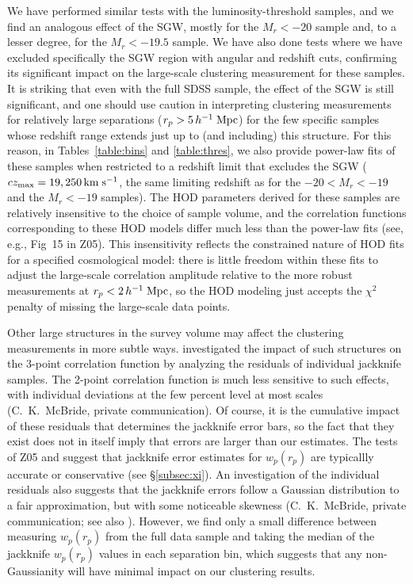 \documentclass[]{emulateapj}
\newcommand{\kms}{\,{\rm km}\;{\rm s}^{-1}}
\newcommand{\hmpc}{\,h^{-1}\;{\rm Mpc}}
\newcommand{\wrp}{{w_p(r_p)}}
\begin{document}
We have performed similar tests with the luminosity-threshold samples, and
we find an analogous effect of the SGW, mostly for the $M_r<-20$ sample and, 
to a lesser degree, for the $M_r<-19.5$ sample.  We have also done tests 
where we have excluded specifically the SGW region with angular and
redshift cuts, confirming its significant impact on the large-scale 
clustering measurement for these samples. It is striking 
that even with the full SDSS sample, the effect of the SGW is still 
significant, and one should use caution in interpreting clustering 
measurements for relatively large separations ($r_p > 5 \hmpc$) for the 
few specific samples whose redshift range extends just up to (and including) 
this structure. For this reason, in Tables~\ref{table:bins} and 
\ref{table:thres}, we also provide power-law fits of these samples when 
restricted to a redshift limit that excludes the SGW 
($cz_{\rm max}=19,250\kms$, the same limiting redshift as for the 
$-20<M_r<-19$ and the $M_r<-19$ samples). 
The HOD parameters derived for these samples are relatively insensitive
to the choice of sample volume, and the correlation functions
corresponding to these HOD models differ much less than the power-law fits
(see, e.g., Fig~15 in Z05).
This insensitivity reflects the constrained nature of HOD fits for
a specified cosmological model: there is little freedom within these
fits to adjust the large-scale correlation amplitude relative to the
more robust
measurements at $r_p < 2\hmpc$, so the HOD modeling just accepts
the $\chi^2$ penalty of missing the large-scale data points.

Other large structures in the survey volume may
affect the clustering measurements in more subtle ways. 
\citet{mcbride10} investigated the impact of
such structures on the 3-point correlation function
by analyzing the residuals of individual jackknife samples. 
The 2-point correlation function is much less sensitive to such
effects, with individual deviations at the few percent level
at most scales (C.\ K.\ McBride, private communication).
Of course, it is the cumulative impact of these residuals
that determines the jackknife error bars, so the fact that they
exist does not in itself imply that errors are larger than
our estimates.  The tests of Z05 and \cite{norberg09}
suggest that jackknife error estimates for $\wrp$ are typicallly
accurate or conservative (see \S\ref{subsec:xi}).
An investigation 
of the individual residuals also suggests that the jackknife errors 
follow a Gaussian distribution to a fair approximation, but with 
some noticeable skewness (C.\ K.\ McBride, private communication;
see also \citealt{norberg11}).
However, we find only a small difference between measuring $\wrp$
from the full data sample and taking the median of the jackknife
$\wrp$ values in each separation bin, which suggests that any
non-Gaussianity will have minimal impact on our clustering results.
\end{document}
